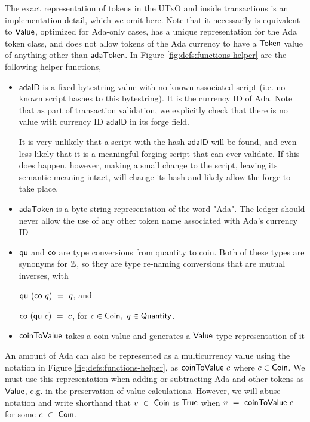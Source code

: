 The exact representation of tokens in the UTxO and inside transactions
is an implementation detail, which we omit here.
Note that it necessarily is equivalent to $\mathsf{Value}$, optimized
for Ada-only cases, has a unique representation for the Ada token class,
and does not allow tokens of the Ada currency to have a $\mathsf{Token}$ value
of anything other than $\mathsf{adaToken}$.
In Figure \ref{fig:defs:functions-helper} are the following helper functions,

\begin{itemize}
  \item $\mathsf{adaID}$ is a fixed bytestring value with no known associated
  script (i.e. no known script hashes to this bytestring). It is the currency ID of Ada.
  Note that as part of transaction validation, we explicitly check that there is no
  value with currency ID $\mathsf{adaID}$ in its forge field.

  It is very unlikely
  that a script with the hash $\mathsf{adaID}$ will be found, and even less likely
  that it is a meaningful forging script that can ever validate. If this does
  happen, however, making a small change to the script, leaving its semantic meaning
  intact, will change its hash and likely allow the forge to take place.

  \item $\mathsf{adaToken}$ is a byte string representation of the word "Ada".
  The ledger should never allow the use of any other token name associated
  with Ada's currency ID
  \item $\mathsf{qu}$ and $\mathsf{co}$ are type conversions from quantity to
  coin. Both of these types are synonyms for $\mathbb{Z}$, so they are
  type re-naming conversions that are mutual inverses, with

  $\mathsf{qu} ~(\mathsf{co} ~q )~= ~q$, and

  $\mathsf{co}~ (\mathsf{qu}~ c) ~=~ c$, for $c \in \mathsf{Coin},~q \in \mathsf{Quantity}$.

  \item $\mathsf{coinToValue}$ takes a coin value and generates a $\mathsf{Value}$ type representation
  of it
\end{itemize}

An amount of Ada can also be represented as a multicurrency value
using the notation in Figure \ref{fig:defs:functions-helper}, as
$\mathsf{coinToValue}~c$ where $c \in \mathsf{Coin}$. We must use this representation
when adding or subtracting Ada and other tokens as $\mathsf{Value}$, e.g. in the
preservation of value calculations. However, we will abuse notation and
write shorthand that $v ~\in~ \mathsf{Coin}$ is $\mathsf{True}$ when
$v~ =~ \mathsf{coinToValue}~ c$ for some $c~\in~\mathsf{Coin}$.

